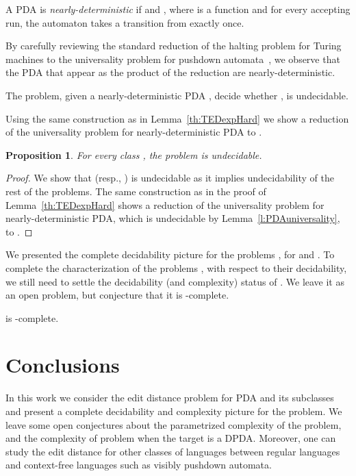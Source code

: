 \documentclass{CSML}
\newtheorem{proposition}[theorem]{Proposition}
\begin{document}
\begin{defi}
A PDA  is \emph{nearly-deterministic} if 
 and , where  is a function and for
every accepting run, the automaton takes a transition from  exactly once.
\end{defi}

By carefully reviewing the standard reduction of the halting problem for Turing machines to 
the universality problem for pushdown automata~\cite{HU79}, we observe that
the PDA that appear as the product of the reduction are 
nearly-deterministic.

\begin{lem}
The problem, given a nearly-deterministic PDA , decide
whether , is undecidable.
\label{l:PDAuniversality}
\end{lem}


Using the same construction as in Lemma~\ref{th:TEDexpHard} we show
a reduction of the universality problem for nearly-deterministic PDA to
.

\begin{proposition}
For every class ,
the problem  is undecidable.
\label{th:fromDPDAUndecidable}
\end{proposition}
\begin{proof} 
We show that  (resp., ) is undecidable as it implies undecidability of the rest of the problems.
The same construction 
as in the proof of Lemma~\ref{th:TEDexpHard} shows a reduction of 
the universality problem for nearly-deterministic PDA, which is undecidable by Lemma~\ref{l:PDAuniversality}, to .
\end{proof}


We presented the complete decidability picture for the problems , for
  and . 
To complete the characterization of the problems ,
with respect to their decidability, we still need to settle the decidability (and complexity)
status of . We leave it as an open problem, but conjecture that it is -complete. 

\begin{conj}
 is -complete.
\label{conj:FEDisUndec}
\end{conj}

 

\section{Conclusions}
In this work we consider the edit distance problem for PDA and its subclasses
and present a complete decidability and complexity picture for the  problem.
We leave some open conjectures about the parametrized complexity of the 
problem, and the complexity of  problem when the target is a DPDA.
Moreover, one can study the edit distance for other classes of languages between 
regular languages and context-free languages such as visibly pushdown automata.
\end{document}
